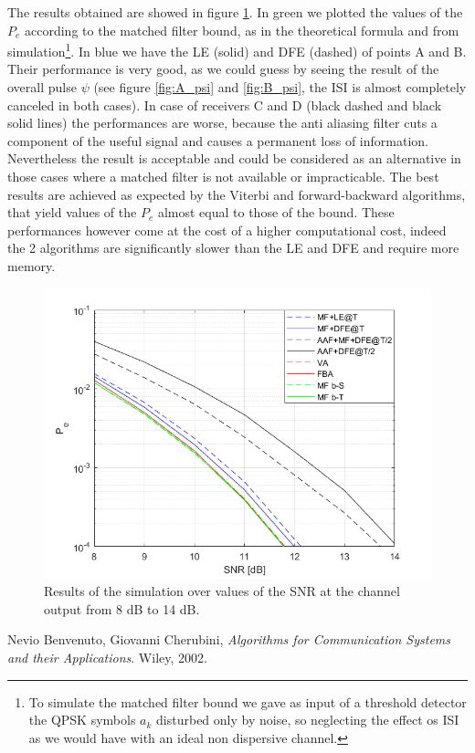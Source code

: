 \documentclass[a4paper,11.5pt]{article}
\begin{document}
The results obtained are showed in figure \ref{fig:SNR}. In green we plotted the values of the $P_e$ according to the matched filter bound, as in the theoretical formula and from simulation\footnote{To simulate the matched filter bound we gave as input of a threshold detector the QPSK symbols $a_k$ disturbed only by noise, so neglecting the effect os ISI as we would have with an ideal non dispersive channel.}. In blue we have the LE (solid) and DFE (dashed) of points A and B. Their performance is very good, as we could guess by seeing the result of the overall pulse $\psi$ (see figure \ref{fig:A_psi} and \ref{fig:B_psi}, the ISI is almost completely canceled in both cases).
In case of receivers C and D (black dashed and black solid lines) the performances are worse, because the anti aliasing filter cuts a component of the useful signal and causes a permanent loss of information. Nevertheless the result is acceptable and could be considered as an alternative in those cases where a matched filter is not available or impracticable. The best results are achieved as expected by the Viterbi and forward-backward algorithms, that yield values of the $P_e$ almost equal to those of the bound. These performances however come at the cost of a higher computational cost, indeed the 2 algorithms are significantly slower than the LE and DFE and require more memory.


\begin{figure}[ht]
	\begin{center}   
		\includegraphics[width=\textwidth]{figs/SNR_Pe.png} 
		\caption{Results of the simulation over values of the SNR at the channel output from 8 dB to 14 dB.}
		\label{fig:SNR}
	\end{center}
\end{figure}


 
\begin{thebibliography}{15}
	
	Nevio Benvenuto, Giovanni Cherubini,
	\textit{Algorithms for Communication Systems and their Applications}. 
	Wiley, 2002.
	

	
\end{thebibliography}
\end{document}
